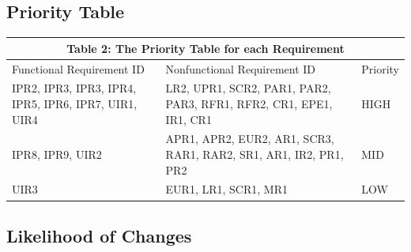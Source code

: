\documentclass[12pt]{article}
\begin{document}
\subsection{Priority Table}
\begin{tabular}{|p{}|p{}|p{}|}

\hline \multicolumn{3}{|c|}{Table 2: The Priority Table for each Requirement}\\

\hline Functional Requirement ID&Nonfunctional Requirement ID&Priority\\

\hline IPR2, IPR3, IPR3, IPR4, IPR5, IPR6, IPR7, UIR1, UIR4&LR2, UPR1, SCR2, PAR1, PAR2, PAR3, RFR1, RFR2, CR1, EPE1, IR1, CR1&HIGH\\

\hline IPR8, IPR9, UIR2&APR1, APR2, EUR2, AR1, SCR3, RAR1, RAR2, SR1, AR1, IR2, PR1, PR2&MID\\

\hline UIR3&EUR1, LR1, SCR1, MR1&LOW\\

\hline

\end{tabular}

\subsection{Likelihood of Changes}
\end{document}
